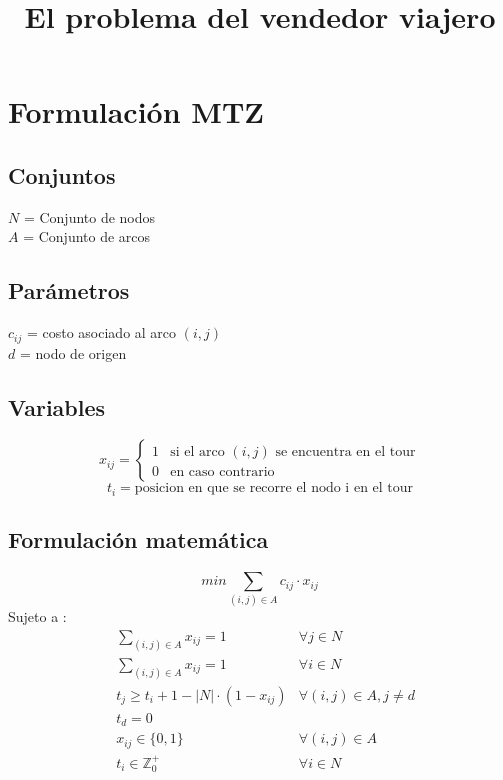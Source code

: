 \documentclass{article}
\title{El problema del vendedor viajero}
\numberwithin{equation}{section}
\begin{document}
\section{Formulación MTZ}
\subsection{Conjuntos}
$N$ = Conjunto de nodos\\
$A$ = Conjunto de arcos
\subsection{Parámetros}
$c_{ij}$ = costo asociado al arco $(i,j)$\\
$d$ = nodo de origen
\subsection{Variables}
\begin{flushleft}
\[x_{ij}={\begin{cases}1&{\mbox{si el arco $(i,j)$ se encuentra en el tour}}\\0&{\mbox{en caso contrario}}\end{cases}}
\]
\[t_{i} = \mbox{posicion en que se recorre el nodo i en el tour}\]
\end{flushleft}
\subsection{Formulación matemática}
\begin{equation}
min \sum_{(i,j) \in A} c_{ij} \cdot x_{ij}
\end{equation}
Sujeto a : \begin{align}
& \sum_{(i,j) \in A} x_{ij} = 1 &\forall j \in N \\
& \sum_{(i,j) \in A} x_{ij} = 1 &\forall i \in N \\
& t_{j} \geq t_{i} + 1 - |N| \cdot (1 - x_{ij}) & \forall (i,j) \in A, j \neq d\\
& t_{d} = 0\\
& x_{ij} \in \{0,1\} &\forall (i,j) \in A\\
& t_{i} \in \mathbb{Z}^{+}_{0} &\forall i \in N
\end{align}
\end{document}
